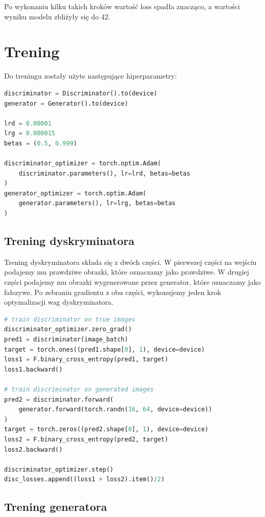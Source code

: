 \documentclass[a4paper]{article}
\begin{document}
Po wykonaniu kilku takich kroków wartość loss spadła znacząco, a wartości wyniku
modelu zbliżyły się do 42.

\section{Trening}
Do treningu zostały użyte następujące hiperparametry:
\begin{lstlisting}[language=python,caption={Parametry treningu}]
discriminator = Discriminator().to(device)
generator = Generator().to(device)

lrd = 0.00001
lrg = 0.000015
betas = (0.5, 0.999)

discriminator_optimizer = torch.optim.Adam(
    discriminator.parameters(), lr=lrd, betas=betas
)
generator_optimizer = torch.optim.Adam(
    generator.parameters(), lr=lrg, betas=betas
)
\end{lstlisting}

\subsection{Trening dyskryminatora}

Trening dyskryminatora składa się z dwóch części. W pierwszej części na wejściu
podajemy mu prawdziwe obrazki, które oznaczamy jako prawdziwe. W drugiej części
podajemy mu obrazki wygenerowane przez generator, które oznaczamy jako fałszywe.
Po zebraniu gradientu z obu części, wykonujemy jeden krok optymalizacji wag dyskryminatora.


\begin{lstlisting}[language=python]
# train discriminator on true images
discriminator_optimizer.zero_grad()
pred1 = discriminator(image_batch)
target = torch.ones((pred1.shape[0], 1), device=device)
loss1 = F.binary_cross_entropy(pred1, target)
loss1.backward()

# train discriminator on generated images
pred2 = discriminator.forward(
    generator.forward(torch.randn(16, 64, device=device))
)
target = torch.zeros((pred2.shape[0], 1), device=device)
loss2 = F.binary_cross_entropy(pred2, target)
loss2.backward()

discriminator_optimizer.step()
disc_losses.append((loss1 + loss2).item()/2)
\end{lstlisting}

\subsection{Trening generatora}
\end{document}

